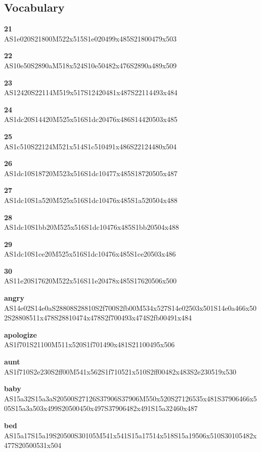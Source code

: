 \documentclass{article}
\begin{document}
\subsection{Vocabulary}

\begin{glossary}

\textbf{21}\\
AS1e020S21800M522x515S1e020499x485S21800479x503

\textbf{22}\\
AS10e50S2890aM518x524S10e50482x476S2890a489x509

\textbf{23}\\
AS12420S22114M519x517S12420481x487S22114493x484

\textbf{24}\\
AS1dc20S14420M525x516S1dc20476x486S14420503x485

\textbf{25}\\
AS1c510S22124M521x514S1c510491x486S22124480x504

\textbf{26}\\
AS1dc10S18720M523x516S1dc10477x485S18720505x487

\textbf{27}\\
AS1dc10S1a520M525x516S1dc10476x485S1a520504x488

\textbf{28}\\
AS1dc10S1bb20M525x516S1dc10476x485S1bb20504x488

\textbf{29}\\
AS1dc10S1ce20M525x516S1dc10476x485S1ce20503x486

\textbf{30}\\
AS11e20S17620M522x516S11e20478x485S17620506x500

\textbf{angry}\\
AS14e02S14e0aS28808S28810S2f700S2fb00M534x527S14e02503x501S14e0a466x502S28808511x478S28810474x478S2f700493x474S2fb00491x484

\textbf{apologize}\\
AS1f701S21100M511x520S1f701490x481S21100495x506

\textbf{aunt}\\
AS1f710S2e230S2ff00M541x562S1f710521x510S2ff00482x483S2e230519x530

\textbf{baby}\\
AS15a32S15a3aS20500S27126S37906S37906M550x520S27126535x481S37906466x505S15a3a503x499S20500450x497S37906482x491S15a32460x487

\textbf{bed}\\
AS15a17S15a19S20500S30105M541x541S15a17514x518S15a19506x510S30105482x477S20500531x504


\end{glossary}
\end{document}
